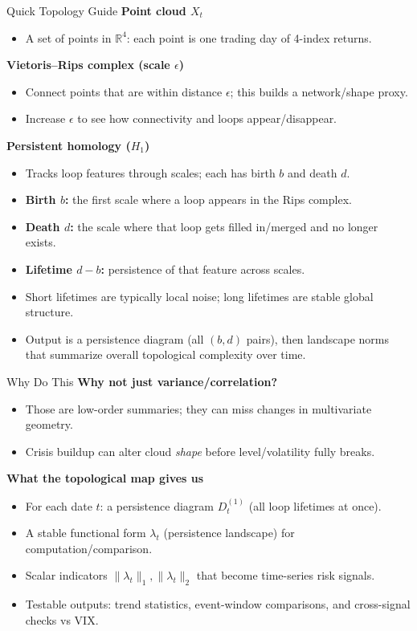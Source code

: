 \documentclass[aspectratio=169,10pt]{beamer}
\begin{document}
\begin{frame}{Quick Topology Guide}
\textbf{Point cloud \(X_t\)}
\begin{itemize}
  \item A set of points in \(\mathbb{R}^4\): each point is one trading day of 4-index returns.
\end{itemize}

\textbf{Vietoris--Rips complex (scale \(\epsilon\))}
\begin{itemize}
  \item Connect points that are within distance \(\epsilon\); this builds a network/shape proxy.
  \item Increase \(\epsilon\) to see how connectivity and loops appear/disappear.
\end{itemize}

\textbf{Persistent homology (\(H_1\))}
\begin{itemize}
  \item Tracks loop features through scales; each has birth \(b\) and death \(d\).
  \item \textbf{Birth \(b\):} the first scale where a loop appears in the Rips complex.
  \item \textbf{Death \(d\):} the scale where that loop gets filled in/merged and no longer exists.
  \item \textbf{Lifetime \(d-b\):} persistence of that feature across scales.
  \item Short lifetimes are typically local noise; long lifetimes are stable global structure.
  \item Output is a persistence diagram (all \((b,d)\) pairs), then landscape norms that summarize overall topological complexity over time.
\end{itemize}
\end{frame}

\begin{frame}{Why Do This}
\textbf{Why not just variance/correlation?}
\begin{itemize}
  \item Those are low-order summaries; they can miss changes in multivariate geometry.
  \item Crisis buildup can alter cloud \emph{shape} before level/volatility fully breaks.
\end{itemize}

\textbf{What the topological map gives us}
\begin{itemize}
  \item For each date \(t\): a persistence diagram \(D_t^{(1)}\) (all loop lifetimes at once).
  \item A stable functional form \(\lambda_t\) (persistence landscape) for computation/comparison.
  \item Scalar indicators \(\|\lambda_t\|_1,\|\lambda_t\|_2\) that become time-series risk signals.
  \item Testable outputs: trend statistics, event-window comparisons, and cross-signal checks vs VIX.
\end{itemize}
\end{frame}
\end{document}
